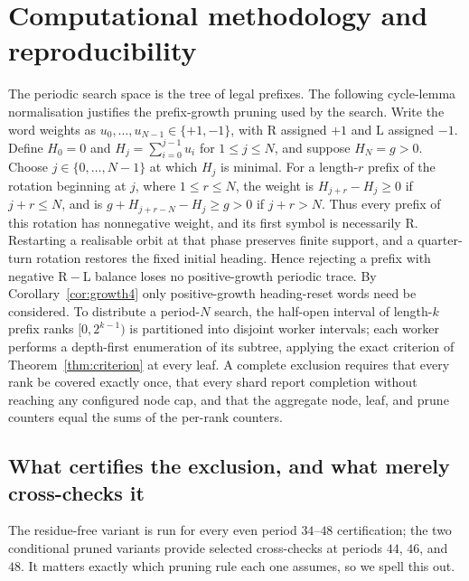 \documentclass[11pt,reqno]{amsart}
\theoremstyle{plain}
\theoremstyle{definition}
\newcommand{\growth}{g}
\newcommand{\turnR}{\mathrm{R}}
\newcommand{\turnL}{\mathrm{L}}
\begin{document}
\section{Computational methodology and reproducibility}\label{app:repro}

The periodic search space is the tree of legal prefixes. The following cycle-lemma
normalisation justifies the prefix-growth pruning used by the search. Write the word
weights as $u_0,\ldots,u_{N-1}\in\{+1,-1\}$, with $\turnR$ assigned $+1$ and
$\turnL$ assigned $-1$. Define $H_0=0$ and
$H_j=\sum_{i=0}^{j-1}u_i$ for $1\le j\le N$, and suppose
$H_N=\growth>0$. Choose $j\in\{0,\ldots,N-1\}$ at which $H_j$ is minimal. For a
length-$r$ prefix of the rotation beginning at $j$, where $1\le r\le N$, the weight
is $H_{j+r}-H_j\ge0$ if $j+r\le N$, and is
$\growth+H_{j+r-N}-H_j\ge\growth>0$ if $j+r>N$. Thus every prefix of this rotation
has nonnegative weight, and its first symbol is necessarily $\turnR$. Restarting a
realisable orbit at that phase
preserves finite support, and a quarter-turn rotation restores the fixed initial
heading. Hence rejecting a prefix with negative $\turnR-\turnL$ balance loses no
positive-growth periodic trace. By Corollary~\ref{cor:growth4} only positive-growth
heading-reset words need be considered. To distribute a
period-$N$ search, the half-open interval of length-$k$ prefix ranks $[0,2^{k-1})$ is
partitioned into disjoint worker intervals; each worker performs a depth-first
enumeration of its subtree, applying the exact criterion of
Theorem~\ref{thm:criterion} at every leaf. A complete exclusion requires that every
rank be covered exactly once, that every shard report completion without reaching any
configured node cap, and
that the aggregate node, leaf, and prune counters equal the sums of the per-rank
counters.

\subsection*{What certifies the exclusion, and what merely cross-checks it}

The residue-free variant is run for every even period $34$--$48$ certification;
the two conditional pruned variants provide selected cross-checks at periods
$44$, $46$, and $48$. It matters exactly which pruning rule each one assumes, so we
spell this out.
\end{document}
